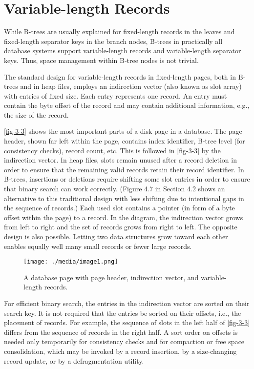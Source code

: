 \hypertarget{variable-length-records}{%
\section{Variable-length Records}\label{variable-length-records}}

While B-trees are usually explained for fixed-length records in the
leaves and fixed-length separator keys in the branch nodes, B-trees in
practically all database systems support variable-length records and
variable-length separator keys. Thus, space management within B-tree
nodes is not trivial.

The standard design for variable-length records in fixed-length pages,
both in B-trees and in heap files, employs an indirection vector (also
known as slot array) with entries of fixed size. Each entry represents
one record. An entry must contain the byte offset of the record and may
contain additional information, e.g., the size of the record.

\autoref{fig-3-3} shows the most important parts of a disk page in a database.
The page header, shown far left within the page, contains index
identifier, B-tree level (for consistency checks), record count, etc.
This is followed in \autoref{fig-3-3} by the indirection vector. In heap files,
slots remain unused after a record deletion in order to ensure that the
remaining valid records retain their record identifier. In B-trees,
insertions or deletions require shifting some slot entries in order to
ensure that binary search can work correctly. (Figure 4.7 in Section 4.2
shows an alternative to this traditional design with less shifting due
to intentional gaps in the sequence of records.) Each used slot contains
a pointer (in form of a byte offset within the page) to a record. In the
diagram, the indirection vector grows from left to right and the set of
records grows from right to left. The opposite design is also possible.
Letting two data structures grow toward each other enables equally well
many small records or fewer large records.

\begin{figure}
  \centering
  \texttt{[image: ./media/image1.png]}
  \caption{A database page with page header, indirection vector, and
  variable-length records.\label{fig-3-3}}
\end{figure}

For efficient binary search, the entries in the indirection vector are
sorted on their search key. It is not required that the entries be
sorted on their offsets, i.e., the placement of records. For example,
the sequence of slots in the left half of \autoref{fig-3-3} differs from the
sequence of records in the right half. A sort order on offsets is needed
only temporarily for consistency checks and for compaction or free space
consolidation, which may be invoked by a record insertion, by a
size-changing record update, or by a defragmentation utility.

